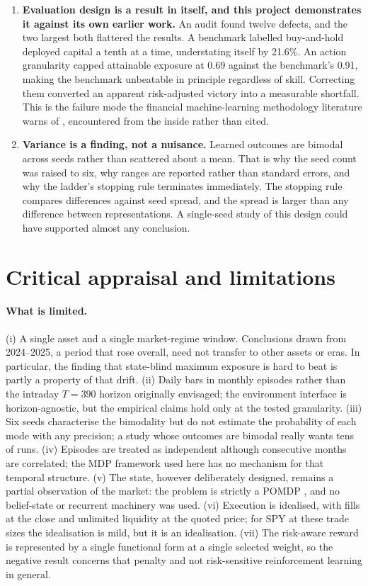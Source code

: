 \begin{enumerate}
  \item \textbf{Evaluation design is a result in itself, and this project
  demonstrates it against its own earlier work.} An audit found twelve
  defects, and the two largest both flattered the results. A benchmark
  labelled buy-and-hold deployed capital a tenth at a time, understating
  itself by 21.6\%. An action granularity capped attainable exposure at
  0.69 against the benchmark's 0.91, making the benchmark unbeatable in
  principle regardless of skill. Correcting them
  converted an apparent risk-adjusted victory into a measurable shortfall.
  This is the failure mode the financial machine-learning methodology
  literature warns of \cite{bailey2014, lopezdeprado2018}, encountered from
  the inside rather than cited.

  \item \textbf{Variance is a finding, not a nuisance.} Learned outcomes are
  bimodal across seeds rather than scattered about a mean. That is why the
  seed count was raised to six, why ranges are reported rather than standard
  errors, and why the ladder's stopping rule terminates immediately. The
  stopping rule compares differences against seed spread, and the spread is
  larger than any difference between representations. A single-seed study of
  this design could have supported almost any conclusion.
\end{enumerate}

\section{Critical appraisal and limitations}
\label{sec:conc_appraisal}

\paragraph{What is limited.} (i) A single asset and a single market-regime
window. Conclusions drawn from 2024--2025, a period that rose overall, need
not transfer to other assets or eras. In particular, the finding that
state-blind maximum exposure is hard to beat is partly a property of that
drift. (ii) Daily bars in monthly episodes rather than the intraday
$T{=}390$ horizon originally envisaged; the environment interface is
horizon-agnostic, but the empirical claims hold only at the tested
granularity. (iii) Six seeds characterise the bimodality but do not
estimate the probability of each mode with any precision; a study whose
outcomes are bimodal really wants tens of runs. (iv) Episodes are treated as
independent although consecutive months are correlated; the MDP framework
used here has no mechanism for that temporal structure. (v) The state,
however deliberately designed, remains a partial observation of the market:
the problem is strictly a POMDP \cite{kaelbling1998}, and no belief-state or
recurrent machinery was used. (vi) Execution is idealised, with fills at the
close and unlimited liquidity at the quoted price; for SPY at these trade
sizes the idealisation is mild, but it is an idealisation. (vii) The
risk-aware reward is represented by a single functional form at a single
selected weight, so the negative result concerns that penalty and not
risk-sensitive reinforcement learning in general.

